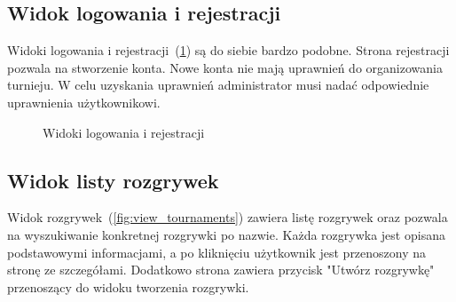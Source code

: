 \documentclass[shortabstract]{iithesis}
\begin{document}
\subsection{Widok logowania i rejestracji}
Widoki logowania i rejestracji~(\ref{fig:view_login_and_registration}) są do siebie bardzo podobne.
Strona rejestracji pozwala na stworzenie konta. Nowe konta nie mają uprawnień do organizowania turnieju.
W celu uzyskania uprawnień administrator musi nadać odpowiednie uprawnienia użytkownikowi.
\begin{figure}[H]
    \centering
    \hfill
    \caption{Widoki logowania i rejestracji}
    \label{fig:view_login_and_registration}
\end{figure}
\subsection{Widok listy rozgrywek}
Widok rozgrywek~(\ref{fig:view_tournaments}) zawiera listę rozgrywek oraz pozwala na wyszukiwanie konkretnej rozgrywki po nazwie.
Każda rozgrywka jest opisana podstawowymi informacjami, a po kliknięciu użytkownik jest przenoszony na stronę ze szczegółami.
Dodatkowo strona zawiera przycisk "Utwórz rozgrywkę" przenoszący do widoku tworzenia rozgrywki.
\end{document}
